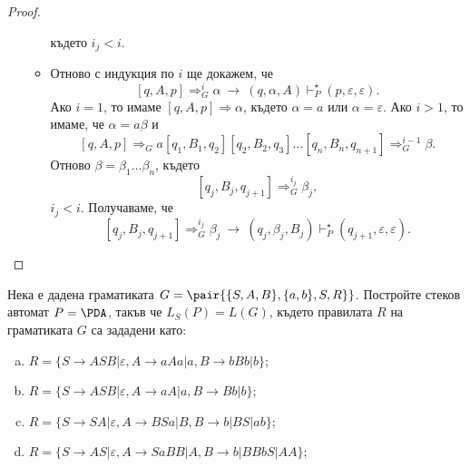 \begin{proof}
\begin{enumerate}[1)]
\begin{itemize}
      където $i_j < i$.
    \item
      Отново с индукция по $i$ ще докажем, че
      \[[q,A,p] \Rightarrow^i_G \alpha\ \rightarrow\ (q,\alpha,A) \vdash^\star_P (p,\varepsilon,\varepsilon).\]
      Ако $i = 1$, то имаме $[q,A,p] \Rightarrow \alpha$, където $\alpha = a$ или $\alpha = \varepsilon$.
      Ако $i > 1$, то имаме, че $\alpha = a\beta$ и 
      \[[q,A,p] \Rightarrow_G a[q_1,B_1,q_2][q_2,B_2,q_3]\dots[q_n,B_n,q_{n+1}] \Rightarrow^{i-1}_G \beta.\]
      Отново $\beta = \beta_1\dots \beta_n$, където
      \[[q_j,B_j,q_{j+1}] \Rightarrow^{i_j}_G \beta_j,\]
      $i_j < i$.
      Получаваме, че 
      \[[q_j,B_j,q_{j+1}] \Rightarrow^{i_j}_G \beta_j\ \rightarrow\ (q_j,\beta_j,B_j) \vdash^\star_P (q_{j+1},\varepsilon,\varepsilon).\]
    \end{itemize}
  \end{enumerate}
\end{proof}

\begin{problem}
  Нека е дадена граматиката $G = \pair{\{S,A,B\},\{a,b\},S,R\}}$.
  Постройте стеков автомат $P = \PDA$, такъв че $L_S(P) = L(G)$, където правилата $R$ на граматиката $G$ са зададени като:
  \begin{enumerate}[a)]
  \item
    $R = \{S\rightarrow ASB\vert \varepsilon, A\rightarrow aAa\vert a, B\rightarrow bBb\vert b\}$;
  \item
    $R = \{S\rightarrow ASB\vert \varepsilon, A\rightarrow aA\vert a, B\rightarrow Bb\vert b\}$;
  \item
    $R =\{S\rightarrow SA|\varepsilon,A\rightarrow BSa|B, B\rightarrow b|BS|ab\}$;
  \item
    $R = \{S\rightarrow AS|\varepsilon,A\rightarrow SaBB|A, B\rightarrow b|BBbS|AA\}$;
  \end{enumerate}
\end{problem}

